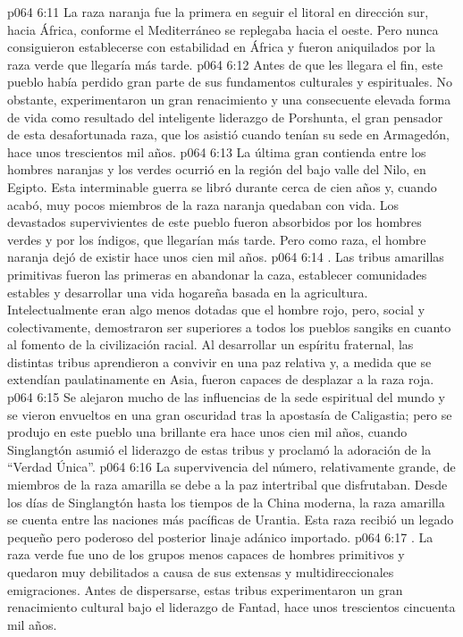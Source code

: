 \vs p064 6:11 La raza naranja fue la primera en seguir el litoral en dirección sur, hacia África, conforme el Mediterráneo se replegaba hacia el oeste. Pero nunca consiguieron establecerse con estabilidad en África y fueron aniquilados por la raza verde que llegaría más tarde.
\vs p064 6:12 Antes de que les llegara el fin, este pueblo había perdido gran parte de sus fundamentos culturales y espirituales. No obstante, experimentaron un gran renacimiento y una consecuente elevada forma de vida como resultado del inteligente liderazgo de Porshunta, el gran pensador de esta desafortunada raza, que los asistió cuando tenían su sede en Armagedón, hace unos trescientos mil años.
\vs p064 6:13 La última gran contienda entre los hombres naranjas y los verdes ocurrió en la región del bajo valle del Nilo, en Egipto. Esta interminable guerra se libró durante cerca de cien años y, cuando acabó, muy pocos miembros de la raza naranja quedaban con vida. Los devastados supervivientes de este pueblo fueron absorbidos por los hombres verdes y por los índigos, que llegarían más tarde. Pero como raza, el hombre naranja dejó de existir hace unos cien mil años.
\vs p064 6:14 . Las tribus amarillas primitivas fueron las primeras en abandonar la caza, establecer comunidades estables y desarrollar una vida hogareña basada en la agricultura. Intelectualmente eran algo menos dotadas que el hombre rojo, pero, social y colectivamente, demostraron ser superiores a todos los pueblos sangiks en cuanto al fomento de la civilización racial. Al desarrollar un espíritu fraternal, las distintas tribus aprendieron a convivir en una paz relativa y, a medida que se extendían paulatinamente en Asia, fueron capaces de desplazar a la raza roja.
\vs p064 6:15 Se alejaron mucho de las influencias de la sede espiritual del mundo y se vieron envueltos en una gran oscuridad tras la apostasía de Caligastia; pero se produjo en este pueblo una brillante era hace unos cien mil años, cuando Singlangtón asumió el liderazgo de estas tribus y proclamó la adoración de la “Verdad Única”.
\vs p064 6:16 La supervivencia del número, relativamente grande, de miembros de la raza amarilla se debe a la paz intertribal que disfrutaban. Desde los días de Singlangtón hasta los tiempos de la China moderna, la raza amarilla se cuenta entre las naciones más pacíficas de Urantia. Esta raza recibió un legado pequeño pero poderoso del posterior linaje adánico importado.
\vs p064 6:17 . La raza verde fue uno de los grupos menos capaces de hombres primitivos y quedaron muy debilitados a causa de sus extensas y multidireccionales emigraciones. Antes de dispersarse, estas tribus experimentaron un gran renacimiento cultural bajo el liderazgo de Fantad, hace unos trescientos cincuenta mil años.
